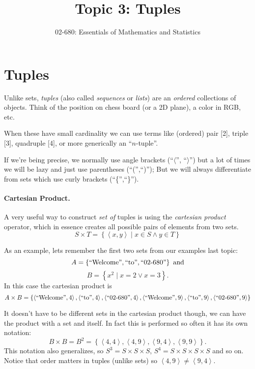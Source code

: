 


\title{Topic 3: Tuples}
\author{02-680: Essentials of Mathematics and Statistics}


\maketitle

\section{Tuples}
Unlike sets, \emph{tuples} (also called \emph{sequences} or \emph{lists}) are an \textit{ordered} collections of objects.
Think of the position on chess board (or a 2D plane), a color in RGB, etc. 

When these have small cardinality we can use terms like (ordered) pair [2], triple [3], quadruple [4], or more generically an ``$n$-tuple''.

If we're being precise, we normally use angle brackets (``$\langle$'', ``$\rangle$'') but a lot of times we will be lazy and just use parentheses (``('',``)''); 
But we will always differentiate from sets which use curly brackets (``\{'',``\}'').

\paragraph{Cartesian Product.}
A very useful way to construct \emph{set of} tuples is using the \emph{cartesian product} operator, 
which in essence creates all possible pairs of elements from two sets.
\[
S \times T = \left\{\left\langle x,y\right\rangle \mid x \in S \wedge y\in T\right\}
\]

As an example, lets remember the first two sets from our examples last topic: 
\[
A = \left\{\textnormal{``Welcome''}, \textnormal{``to''}, \textnormal{``02-680''}\right\} \textnormal{ and}
\]\[
B = \left\{x^2 \mid x=2 \vee x=3 \right\}.
\]
In this case the cartesian product is 
\[
A \times B = \left\{ \left\langle\textnormal{``Welcome''},4\right\rangle, \left\langle\textnormal{``to''},4\right\rangle, \left\langle\textnormal{``02-680''},4\right\rangle,
 \left\langle\textnormal{``Welcome''},9\right\rangle, \left\langle\textnormal{``to''},9\right\rangle, \left\langle\textnormal{``02-680''},9\right\rangle \right\}
\]

It doesn't have to be different sets in the cartesian product though, we can have the product with a set and itself.
In fact this is performed so often it has its own notation:
\[
B \times B = B^2 = \left\{ \left\langle 4,4 \right\rangle, \left\langle 4,9 \right\rangle,  \left\langle 9,4 \right\rangle, \left\langle 9,9 \right\rangle \right\}.
\]
This notation also generalizes, so $S^3 = S \times S \times S$, $S^4 = S\times S\times S\times S$ and so on. 
Notice that order matters in tuples (unlike sets) so $ \left\langle 4,9 \right\rangle \neq \left\langle 9,4 \right\rangle$.

